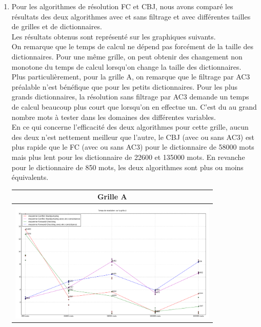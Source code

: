 \documentclass[a4paper,12pt]{report}
\begin{document}
\begin{enumerate}
\begin{table}[!h]
\begin{center}
\begin{tabular}{|c|}
\end{tabular}
\end{center}
\end{table}

\newpage
~~\\
~~\\
~~\\
\item Pour les algorithmes de résolution FC et CBJ, nous avons comparé les résultats des deux algorithmes avec et sans filtrage et avec différentes tailles de grilles et de dictionnaires.\\
Les résultats obtenus sont représenté sur les graphiques suivants.\\

On remarque que le temps de calcul ne dépend pas forcément de la taille des dictionnaires. Pour une même grille, on peut obtenir des changement non monotone du temps de calcul lorsqu'on change la taille des dictionnaires.\\

Plus particulièrement, pour la grille A, on remarque que le filtrage par AC3 préalable n'est bénéfique que pour les petits dictionnaires. Pour les plus grands dictionnaires, la résolution sans filtrage par AC3 demande un temps de calcul beaucoup plus court que lorsqu'on en effectue un. C'est du au grand nombre mots à tester dans les domaines des différentes variables.\\

En ce qui concerne l'efficacité des deux algorithmes pour cette grille, aucun des deux n'est nettement meilleur que l'autre, le CBJ (avec ou sans AC3) est plus rapide que le FC (avec ou sans AC3) pour le dictionnaire de 58000 mots mais plus lent pour les dictionnaire de 22600 et 135000 mots. En revanche pour le dictionnaire de 850 mots, les deux algorithmes sont plus ou moins équivalents.


\begin{table}[!h]
\begin{center}
\begin{tabular}{|c|}

\hline
  Grille A\\
\hline   
   \\
\includegraphics[width=10cm]{Grille_A.png}  \\
\hline



\end{tabular}
\end{center}
\end{table}
\end{enumerate}
\end{document}
